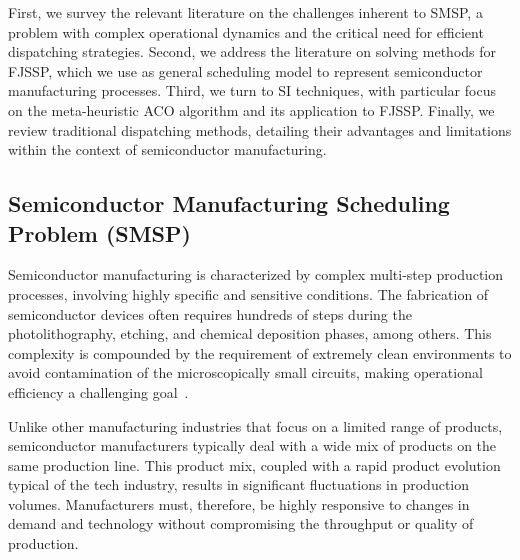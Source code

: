 First, we survey the relevant literature on the challenges inherent to SMSP, a problem with complex operational dynamics and the critical need for efficient dispatching strategies. 
Second, we address the literature on solving methods for FJSSP, which we use as general
scheduling model to represent semiconductor manufacturing processes. %
Third, we turn to SI techniques, with particular focus on the meta-heuristic ACO algorithm and its application to FJSSP.
Finally, we review traditional dispatching methods, detailing their advantages and limitations within the context of semiconductor manufacturing.
\subsection{Semiconductor Manufacturing Scheduling Problem (SMSP)}
Semiconductor manufacturing is characterized by complex multi-step production processes, involving highly specific and sensitive conditions. The fabrication of semiconductor devices often requires hundreds of steps during the photolithography, etching, and chemical deposition phases, among others. This complexity is compounded by the requirement of extremely clean environments to avoid contamination of the microscopically small circuits, making operational efficiency a challenging goal~\cite{May2006}.

Unlike other manufacturing industries that focus on a limited range of products, semiconductor manufacturers typically deal with a wide mix of products on the same production line. This product mix, coupled with a rapid product evolution typical of the tech industry, results in significant fluctuations in production volumes. Manufacturers must, therefore, be highly responsive to changes in demand and technology without compromising the throughput or quality of production.

